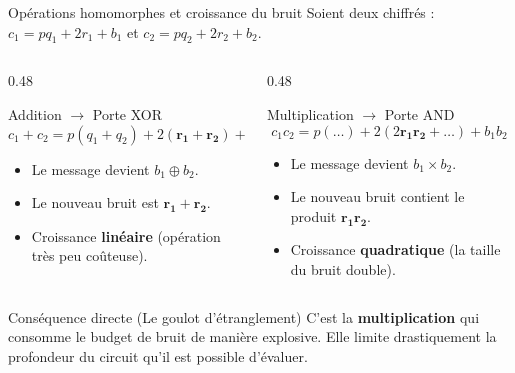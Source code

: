 \documentclass[10pt,aspectratio=169]{beamer}
\begin{document}
\begin{frame}{Opérations homomorphes et croissance du bruit}
  Soient deux chiffrés : $c_1 = pq_1 + 2r_1 + b_1$ et $c_2 = pq_2 + 2r_2 + b_2$.

  \vspace{0.3cm}

  \begin{columns}[T,onlytextwidth]
    \begin{column}{0.48\textwidth}
      \begin{block}{Addition $\longrightarrow$ Porte XOR}
        \[
          c_1 + c_2 = p(q_1+q_2) + 2(\mathbf{r_1+r_2}) + (b_1+b_2)
        \]
      \end{block}
      \begin{itemize}
        \item Le message devient $b_1 \oplus b_2$.
        \item Le nouveau bruit est $\mathbf{r_1 + r_2}$.
        \item Croissance \textbf{linéaire} (opération très peu coûteuse).
      \end{itemize}
    \end{column}

    \begin{column}{0.48\textwidth}
      \begin{alertblock}{Multiplication $\longrightarrow$ Porte AND}
        \[
          c_1 c_2 = p(\dots) + 2(2\mathbf{r_1 r_2} + \dots) + b_1 b_2
        \]
      \end{alertblock}
      \begin{itemize}
        \item Le message devient $b_1 \times b_2$.
        \item Le nouveau bruit contient le produit $\mathbf{r_1 r_2}$.
        \item Croissance \textbf{quadratique} (la taille du bruit double).
      \end{itemize}
    \end{column}
  \end{columns}

  \vspace{0.4cm}

  \begin{exampleblock}{Conséquence directe (Le goulot d'étranglement)}
    C'est la \textbf{multiplication} qui consomme le budget de bruit de manière explosive. Elle limite drastiquement la profondeur du circuit qu'il est possible d'évaluer.
  \end{exampleblock}
\end{frame}
\end{document}
